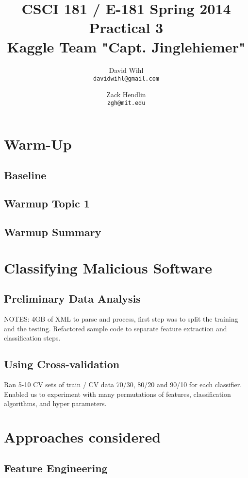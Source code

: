 \documentclass[11pt, oneside]{article}   	%
\title{CSCI 181 / E-181 Spring 2014 Practical 3 \\ 
{\large Kaggle Team "Capt. Jinglehiemer"}
}
\author{
  David Wihl\\
  \texttt{davidwihl@gmail.com}
  \and
  Zack Hendlin\\
  \texttt{zgh@mit.edu} 
}
\begin{document}
\maketitle
\section*{Warm-Up}

\subsection*{Baseline}

\subsection*{Warmup Topic 1}

\subsection*{Warmup Summary}

\section*{Classifying Malicious Software}

\subsection*{Preliminary Data Analysis}

NOTES:
4GB of XML to parse and process, first step was to split the training and the testing.  Refactored sample code to separate feature extraction and classification steps.

\subsection*{Using Cross-validation}

Ran 5-10 CV sets of train / CV data 70/30, 80/20 and 90/10 for each classifier. Enabled us to experiment with many permutations of features, classification algorithms, and hyper parameters.

\section*{Approaches considered}

\subsection*{Feature Engineering}
\end{document}
